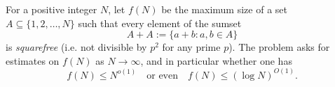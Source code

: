 For a positive integer $N$, let $f(N)$ be the maximum size of a set $A\subseteq\{1,2,\dots,N\}$ such that every element of the sumset
\[A+A := \{a+b : a,b\in A\}\]
is \emph{squarefree} (i.e. not divisible by $p^2$ for any prime $p$).
The problem asks for estimates on $f(N)$ as $N\to\infty$, and in particular whether one has
\[f(N)\le N^{o(1)}\quad\text{or even}\quad f(N)\le (\log N)^{O(1)}.
\]
